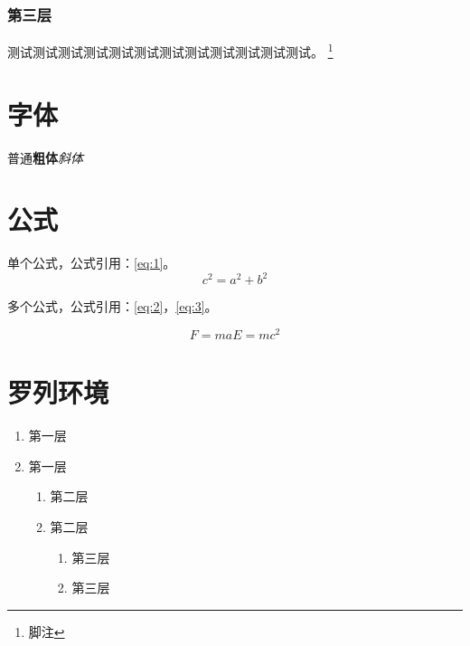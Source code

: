 \documentclass[format=draft,language=chinese,category=SDN]{hustreport}
\begin{document}
\subsubsection{第三层}\label{sec:3}
测试测试测试测试测试测试测试测试测试测试测试测试。
\footnote{\label{footnote:1}脚注}

\section{字体}

普通\textbf{粗体}\emph{斜体}


\section{公式}

单个公式，公式引用：\autoref{eq:1}。
\begin{equation}
 c^2 = a^2 + b^2 \label{eq:1}
\end{equation}

多个公式，公式引用：\autoref{eq:2}，\autoref{eq:3}。

\begin{subequations}
\begin{equation}
  F = ma \label{eq:2}
\end{equation}
\begin{equation}
  E = mc^2 \label{eq:3}
\end{equation}
\end{subequations}

\section{罗列环境}

\begin{enumerate}
    \item 第一层\label{item:1}
    \item 第一层
    \begin{enumerate}
        \item 第二层\label{item:2}
        \item 第二层
        \begin{enumerate}
            \item 第三层\label{item:3}
            \item 第三层
        \end{enumerate}
    \end{enumerate}
\end{enumerate}
\end{document}
